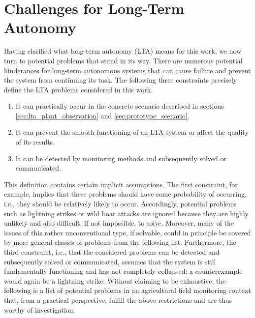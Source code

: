 \documentclass[english, master, utf8]{base/thesis_KBS}
\begin{document}
\section{Challenges for Long-Term Autonomy}
\label{sec:challenges_for_lta}

Having clarified what long-term autonomy (LTA) means for this work, we now turn to potential problems that stand in its way.
There are numerous potential hinderances for long-term autonomous systems that can cause failure and prevent the system from continuing its task.
The following three constraints precisely define the LTA problems considered in this work.
\begin{enumerate}
    \item It can practically occur in the concrete scenario described in sections \ref{sec:lta_plant_observation} and \ref{sec:prototype_scenario}.
    \item It can prevent the smooth functioning of an LTA system or affect the quality of its results.
    \item It can be detected by monitoring methods and subsequently solved or communicated.
\end{enumerate}
This definition contains certain implicit assumptions. The first constraint, for example, implies that these problems should have some probability of occurring,
i.e., they should be relatively likely to occur. Accordingly, potential problems such as lightning strikes or wild boar attacks are ignored because they are highly 
unlikely and also difficult, if not impossible, to solve. Moreover, many of the issues of this rather unconventional type, if solvable, could in principle be covered
by more general classes of problems from the following list. Furthermore, the third constraint, i.e., that the considered problems can be detected and subsequently solved 
or communicated, assumes that the system is still fundamentally functioning and has not completely collapsed; a counterexample would again be a lightning strike.
Without claiming to be exhaustive, the following is a list of potential problems in an agricultural field monitoring context that, 
from a practical perspective, fulfill the above restrictions and are thus worthy of investigation:
\end{document}
